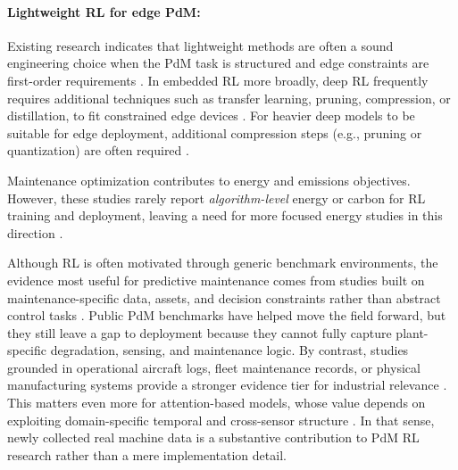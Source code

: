 \documentclass[sn-basic]{sn-jnl}%
\begin{document}
\paragraph{Lightweight RL for edge PdM:}
Existing research indicates that lightweight methods are often a sound engineering choice when the PdM task is structured and edge constraints are first-order requirements \cite{Compare2020, Njor2024, Pandey2023}. In embedded RL more broadly, deep RL frequently requires additional techniques such as transfer learning, pruning, compression, or distillation, to fit constrained edge devices \cite{Jang2020, Szydlo2022, Xu2022}. For heavier deep models to be suitable for edge deployment, additional compression steps (e.g., pruning or quantization) are often required \cite{Pandey2023, Jang2020, Xu2022}.

Maintenance optimization contributes to energy and emissions objectives. However, these studies rarely report \emph{algorithm-level} energy or carbon for RL training and deployment, leaving a need for more focused energy studies in this direction \cite{Banyai2021, Banyai2022, JasiulewiczKaczmarek2024}.

Although RL is often motivated through generic benchmark environments, the evidence most useful for predictive maintenance comes from studies built on maintenance-specific data, assets, and decision constraints rather than abstract control tasks \cite{Andrade2021Aircraft,Dangut2022RareFailure,Zhao2024,Siraskar2025}. Public PdM benchmarks have helped move the field forward, but they still leave a gap to deployment because they cannot fully capture plant-specific degradation, sensing, and maintenance logic. By contrast, studies grounded in operational aircraft logs, fleet maintenance records, or physical manufacturing systems provide a stronger evidence tier for industrial relevance \cite{Andrade2021Aircraft,Dangut2022RareFailure,Chen2024DigitalTwin}. This matters even more for attention-based models, whose value depends on exploiting domain-specific temporal and cross-sensor structure \cite{Zhao2024}. In that sense, newly collected real machine data is a substantive contribution to PdM RL research rather than a mere implementation detail.
\end{document}
